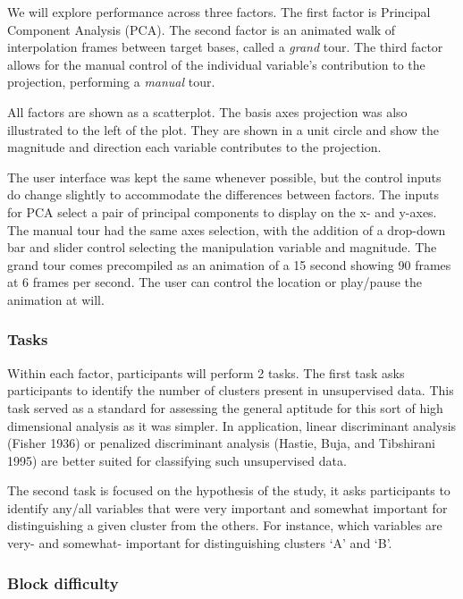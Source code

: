 \documentclass[
  11,
]{article}
\begin{document}
We will explore performance across three factors. The first factor is Principal Component Analysis (PCA). The second factor is an animated walk of interpolation frames between target bases, called a \emph{grand} tour. The third factor allows for the manual control of the individual variable's contribution to the projection, performing a \emph{manual} tour.

All factors are shown as a scatterplot. The basis axes projection was also illustrated to the left of the plot. They are shown in a unit circle and show the magnitude and direction each variable contributes to the projection.

The user interface was kept the same whenever possible, but the control inputs do change slightly to accommodate the differences between factors. The inputs for PCA select a pair of principal components to display on the x- and y-axes. The manual tour had the same axes selection, with the addition of a drop-down bar and slider control selecting the manipulation variable and magnitude. The grand tour comes precompiled as an animation of a 15 second showing 90 frames at 6 frames per second. The user can control the location or play/pause the animation at will.

\hypertarget{sec:tasks}{%
\subsubsection{Tasks}\label{sec:tasks}}

Within each factor, participants will perform 2 tasks. The first task asks participants to identify the number of clusters present in unsupervised data. This task served as a standard for assessing the general aptitude for this sort of high dimensional analysis as it was simpler. In application, linear discriminant analysis (Fisher 1936) or penalized discriminant analysis (Hastie, Buja, and Tibshirani 1995) are better suited for classifying such unsupervised data.

The second task is focused on the hypothesis of the study, it asks participants to identify any/all variables that were very important and somewhat important for distinguishing a given cluster from the others. For instance, which variables are very- and somewhat- important for distinguishing clusters `A' and `B'.

\hypertarget{sec:blocks}{%
\subsubsection{Block difficulty}\label{sec:blocks}}
\end{document}
